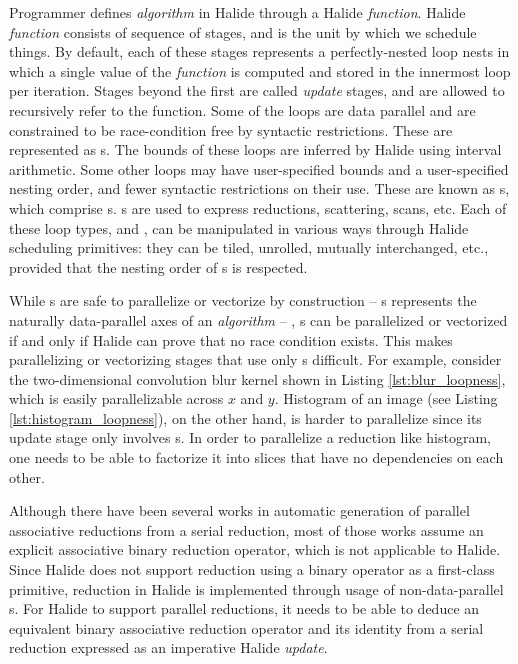 Programmer defines \emph{algorithm} in Halide through a Halide \emph{function}. Halide \emph{function} consists of sequence of stages, and is the unit by which we schedule things. By default, each of these stages represents a perfectly-nested loop nests in which a single value of the \emph{function} is computed and stored in the innermost loop per iteration. Stages beyond the first are called \emph{update} stages, and are allowed to recursively refer to the function. Some of the loops are data parallel and are constrained to be race-condition free by syntactic restrictions. These are represented as s. The bounds of these loops are inferred by Halide using interval arithmetic. Some other loops may have user-specified bounds and a user-specified nesting order, and fewer syntactic restrictions on their use. These are known as s, which comprise s. s are used to express reductions, scattering, scans, etc. Each of these loop types,  and , can be manipulated in various ways through Halide scheduling primitives: they can be tiled, unrolled, mutually interchanged, etc., provided that the nesting order of s is respected. 

While s are safe to parallelize or vectorize by construction -- s represents the naturally data-parallel axes of an \emph{algorithm} -- , s can be parallelized or vectorized if and only if Halide can prove that no race condition exists. This makes parallelizing or vectorizing stages that use only s difficult. For example, consider the two-dimensional convolution blur kernel shown in Listing \ref{lst:blur_loopness}, which is easily parallelizable across  $x$ and $y$. Histogram of an image (see Listing \ref{lst:histogram_loopness}), on the other hand, is harder to parallelize since its update stage only involves s. In order to parallelize a reduction like histogram, one needs to be able to factorize it into slices that have no dependencies on each other.

Although there have been several works in automatic generation of parallel associative reductions from a serial reduction, most of those works assume an explicit associative binary reduction operator, which is not applicable to Halide. Since Halide does not support reduction using a binary operator as a first-class primitive, reduction in Halide is implemented through usage of non-data-parallel s. For Halide to support parallel reductions, it needs to be able to deduce an equivalent binary associative reduction operator and its identity from a serial reduction expressed as an imperative Halide \emph{update}. 

